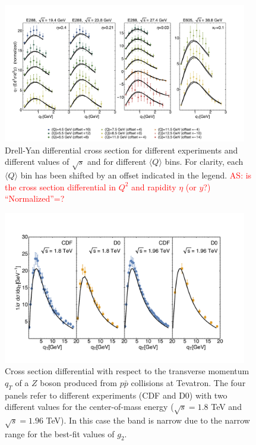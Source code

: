 \documentclass[aps,preprintnumbers,showpacs,nofootinbib,superscriptaddress,floatfix]{revtex4}
\begin{document}
\begin{figure}[h!]
\centering
\includegraphics[width=0.95\textwidth]{plots/DY_SCIplot_flINDEP.pdf}
\caption{Drell-Yan differential cross section for different experiments and different values of $\sqrt{s}$ and for different $\langle Q \rangle$ bins. For clarity, each $\langle Q \rangle$  bin has been shifted by an offset indicated in the legend. \textcolor{red}{AS: is the cross section differential in $Q^2$ and rapidity $\eta$ (or $y$?) ``Normalized''=?}}
\label{f:DY_panel}
\end{figure}
\begin{figure}[h!]
\begin{center}
\includegraphics[width=0.95\textwidth]{plots/Z_SCIplot_flINDEP.pdf}
\end{center}
\caption{Cross section differential with respect to the transverse momentum $q_T$ of a $Z$ boson produced from $p\bar{p}$ collisions at Tevatron. The four panels refer to different experiments (CDF and D$0$) with two different values for the center-of-mass energy ($\sqrt{s} = 1.8$ TeV and $\sqrt{s}=1.96$ TeV). In this case the band is narrow due to the narrow range for the best-fit values of $g_2$.} 
\label{f:Z_qT}
\end{figure}
\end{document}
